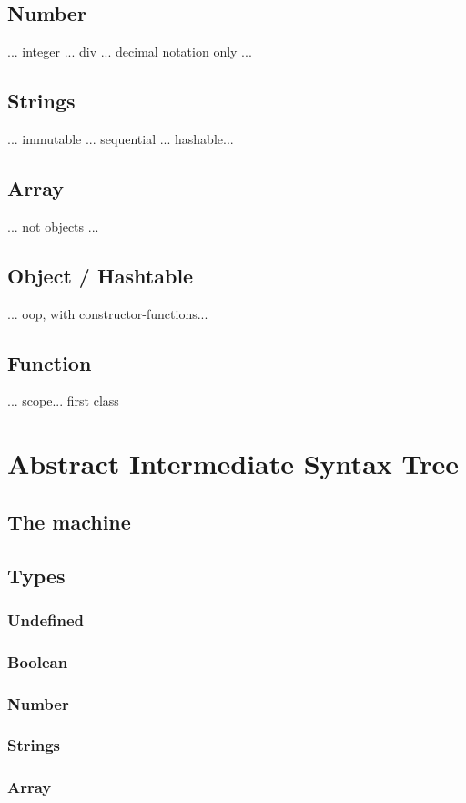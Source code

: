 \subsection{Number}
... integer ... div ... decimal notation only ...
\subsection{Strings}
... immutable ... sequential ... hashable...
\subsection{Array}
... not objects ...
\subsection{Object / Hashtable}
... oop, with constructor-functions...
\subsection{Function}
... scope... first class

\section{Abstract Intermediate Syntax Tree}
\subsection{The machine}
\subsection{Types}
\subsubsection{Undefined}
\subsubsection{Boolean}
\subsubsection{Number}
\subsubsection{Strings}
\subsubsection{Array}
